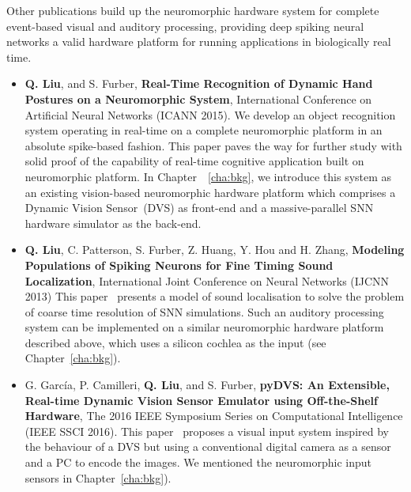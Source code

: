 	Other publications build up the neuromorphic hardware system for complete event-based visual and auditory processing, providing deep spiking neural networks a valid hardware platform for running applications in biologically real time.
\begin{itemize}
	\item 
	\textbf{Q. Liu}, and S. Furber, \textbf{Real-Time Recognition of Dynamic Hand Postures on a Neuromorphic System}, International Conference on Artificial Neural Networks (ICANN 2015).
	We develop an object recognition system operating in real-time on a complete neuromorphic platform in an absolute spike-based fashion.
	This paper paves the way for further study with solid proof of the capability of real-time cognitive application built on neuromorphic platform.
	In Chapter~~\ref{cha:bkg}, we introduce this system as an existing vision-based neuromorphic hardware platform which comprises a Dynamic Vision Sensor~(DVS) as front-end and a massive-parallel SNN hardware simulator as the back-end. 
	
	\item
	\textbf{Q. Liu}, C. Patterson, S. Furber, Z. Huang, Y. Hou and H. Zhang, \textbf{Modeling Populations of Spiking Neurons for Fine Timing Sound Localization}, International Joint Conference on Neural Networks (IJCNN 2013)
	This paper~\citep{liu2013modeling} presents a model of sound localisation to solve the problem of coarse time resolution of SNN simulations.
	Such an auditory processing system can be implemented on a similar neuromorphic hardware platform described above, which uses a silicon cochlea as the input (see Chapter~\ref{cha:bkg}).
	
	\item 
	G. Garc\'ia, P. Camilleri, \textbf{Q. Liu}, and S. Furber, \textbf{pyDVS: An Extensible, Real-time Dynamic Vision Sensor Emulator using Off-the-Shelf Hardware}, The 2016 IEEE Symposium Series on Computational Intelligence (IEEE SSCI 2016).
	This paper~\citep{7850249} proposes a visual input system inspired by the behaviour of a DVS but using a conventional digital camera as a sensor and a
	PC to encode the images.
	We mentioned the neuromorphic input sensors in Chapter~\ref{cha:bkg}).
\end{itemize}


